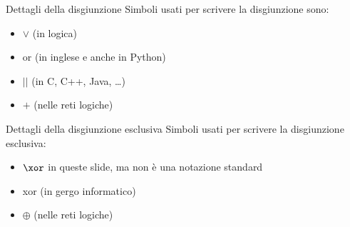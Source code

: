 \documentclass[10pt,dvipsnames]{beamer}
\begin{document}
\begin{frame}{Dettagli della disgiunzione}
    Simboli usati per scrivere la disgiunzione sono:
    \begin{itemize}
        \item \alert{$\vee$ (in logica)}
        \item or (in inglese e anche in Python)
        \item $\texttt{||}$ (in C, C++, Java, \ldots)
        \item $+$ (nelle reti logiche)
    \end{itemize}

\end{frame}

\begin{frame}{Dettagli della disgiunzione esclusiva}
    Simboli usati per scrivere la disgiunzione esclusiva:
    \begin{itemize}
        \item \alert{$\xor$ in queste slide}, ma non è una notazione standard
        \item xor (in gergo informatico)
        \item $\oplus$ (nelle reti logiche)
    \end{itemize}

\end{frame}
\end{document}
